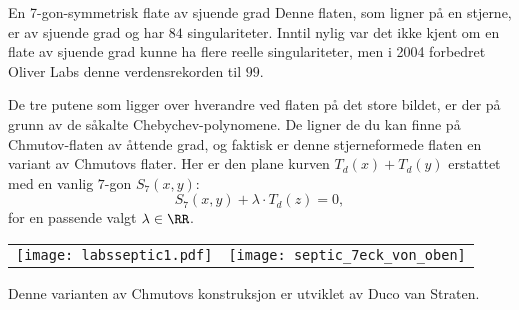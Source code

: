 \begin{surferPage}{En 7-gon-symmetrisk flate av sjuende grad}
Denne flaten, som ligner på en stjerne, er av sjuende grad og har $84$ singulariteter. Inntil nylig var det ikke kjent om en flate av sjuende grad kunne ha flere reelle singulariteter, men i 2004 forbedret Oliver Labs denne verdensrekorden til $99$. 
  
  
 De tre putene som ligger over hverandre ved flaten på det store bildet, er der på grunn av de såkalte Chebychev-polynomene. De ligner de du kan finne på Chmutov-flaten av åttende grad, og faktisk er denne stjerneformede flaten en variant av Chmutovs flater. Her er den plane kurven $T_d(x)+T_d(y)$ erstattet med en vanlig $7$-gon  $S_7(x,y)$: 
   \[S_7(x,y) + \lambda \cdot T_d(z) = 0,\]
   for en passende valgt $\lambda\in\RR$. 
    \vspace*{-0.3em}
    \begin{center}
      \begin{tabular}{c@{\qquad}c}
        \texttt{[image: labsseptic1.pdf]}
        &
        \texttt{[image: septic\_7eck\_von\_oben]}
      \end{tabular}
    \end{center}
    \vspace*{-0.3em}   
   Denne varianten av Chmutovs konstruksjon er utviklet av Duco van Straten.
\end{surferPage}
